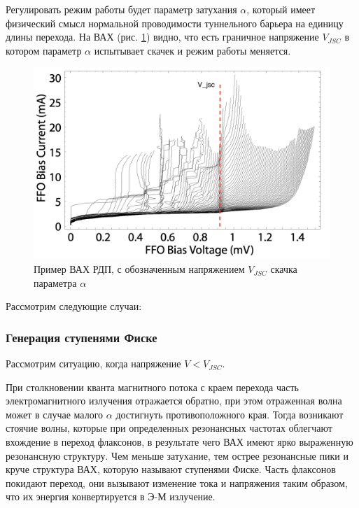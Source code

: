 \documentclass[12pt,a4paper]{article}
\begin{document}
Регулировать режим работы будет параметр затухания $\alpha$, который имеет физический смысл нормальной проводимости туннельного барьера на единицу длины перехода. На ВАХ (рис. \ref{FFO-iv}) видно, что есть граничное напряжение $V_{JSC}$ в котором параметр $\alpha$ испытывает скачек и режим работы меняется.

\begin{figure}[H]
    \centering
    \includegraphics[scale = 0.5]{FFO_iv.png}
    \caption{Пример ВАХ РДП, с обозначенным напряжением $V_{JSC}$ скачка параметра $\alpha$}
    \label{FFO-iv}
\end{figure}

Рассмотрим следующие случаи:

\subsubsection{Генерация ступенями Фиске}

Рассмотрим ситуацию, когда напряжение  $V < V_{JSC}$. \par 

При столкновении кванта магнитного потока с краем перехода часть электромагнитного излучения отражается обратно, при этом отраженная волна может в случае малого $\alpha$ достигнуть противоположного края. Тогда возникают стоячие волны, которые при определенных резонансных частотах облегчают вхождение в переход флаксонов, в результате чего ВАХ имеют ярко
выраженную резонансную структуру. Чем меньше затухание, тем острее резонансные пики и круче структура ВАХ, которую называют ступенями Фиске.
Часть флаксонов покидают переход, они вызывают изменение тока и напряжения таким образом, что их энергия конвертируется в Э-М излучение.
\end{document}
